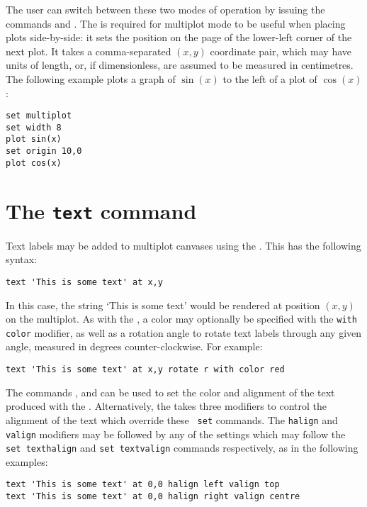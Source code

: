 The user can switch between these two modes of operation by issuing the
commands  and . The
 is required for multiplot mode to be useful when placing
plots side-by-side: it sets the position on the page of the lower-left corner
of the next plot. It takes a comma-separated $(x,y)$ coordinate pair, which may
have units of length, or, if dimensionless, are assumed to be measured in
centimetres. The following example plots a graph of $\sin(x)$ to the left of a
plot of $\cos(x)$:
\begin{verbatim}
set multiplot
set width 8
plot sin(x)
set origin 10,0
plot cos(x)
\end{verbatim}

\section{The {\tt text} command}

Text labels may be added to multiplot canvases using the . This
has the following syntax:

\begin{verbatim}
text 'This is some text' at x,y
\end{verbatim}

In this case, the string `This is some text' would be rendered at position
$(x,y)$ on the multiplot. As with the , a color may
optionally be specified with the {\tt with color} modifier, as well as a
rotation angle to rotate text labels through any given angle, measured in
degrees counter-clockwise. For example:

\begin{verbatim}
text 'This is some text' at x,y rotate r with color red
\end{verbatim}

The commands ,  and
 can be used to set the color and alignment of the
text produced with the . Alternatively, the  takes
three modifiers to control the alignment of the text which override these {\tt
set} commands. The {\tt halign} and {\tt valign} modifiers may be followed by
any of the settings which may follow the {\tt set texthalign} and {\tt set
textvalign} commands respectively, as in the following examples:

\begin{verbatim}
text 'This is some text' at 0,0 halign left valign top
text 'This is some text' at 0,0 halign right valign centre
\end{verbatim}

